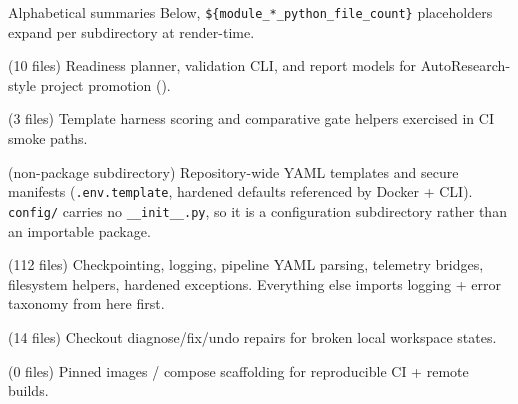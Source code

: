 \documentclass[
  ignorenonframetext,
]{beamer}
\begin{document}
\begin{frame}{Alphabetical summaries}
\protect{}\label{alphabetical-summaries}
Below, \texttt{\$\{module\_*\_python\_file\_count\}} placeholders expand
per subdirectory at render-time.

\begin{block}{ (10 files)}
\protect{}\label{infrastructure.autoresearch-10-files}
Readiness planner, validation CLI, and report models for
AutoResearch-style project promotion
().
\end{block}

\begin{block}{ (3 files)}
\protect{}\label{infrastructure.benchmark-3-files}
Template harness scoring and comparative gate helpers exercised in CI
smoke paths.
\end{block}

\begin{block}{ (non-package subdirectory)}
\protect{}\label{infrastructureconfig-non-package-subdirectory}
Repository-wide YAML templates and secure manifests
(\texttt{.env.template}, hardened defaults referenced by Docker + CLI).
\texttt{config/} carries no \texttt{\_\_init\_\_.py}, so it is a
configuration subdirectory rather than an importable package.
\end{block}

\begin{block}{ (112 files)}
\protect{}\label{infrastructure.core-112-files}
Checkpointing, logging, pipeline YAML parsing, telemetry bridges,
filesystem helpers, hardened exceptions. Everything else imports logging
+ error taxonomy from here first.
\end{block}

\begin{block}{ (14 files)}
\protect{}\label{infrastructure.doctor-14-files}
Checkout diagnose/fix/undo repairs for broken local workspace states.
\end{block}

\begin{block}{ (0 files)}
\protect{}\label{infrastructure.docker-0-files}
Pinned images / compose scaffolding for reproducible CI + remote builds.
\end{block}


\end{frame}
\end{document}
